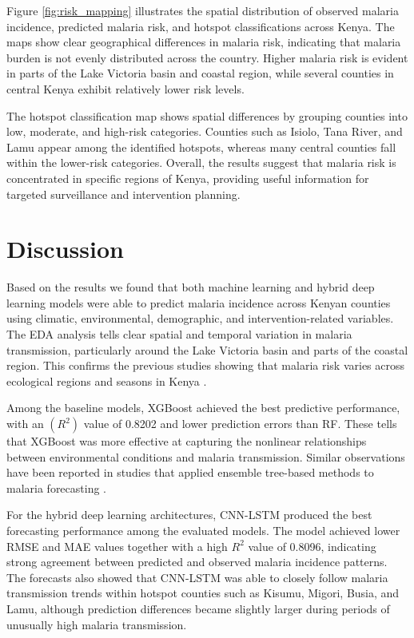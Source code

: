 \vspace{-0.3cm}

\small 
Figure \ref{fig:risk_mapping} illustrates the spatial distribution of observed malaria incidence, predicted malaria risk, and hotspot classifications across Kenya. The maps show clear geographical differences in malaria risk, indicating that malaria burden is not evenly distributed across the country. Higher malaria risk is evident in parts of the Lake Victoria basin and coastal region, while several counties in central Kenya exhibit relatively lower risk levels.

The hotspot classification map shows spatial differences by grouping counties into low, moderate, and high-risk categories. Counties such as  Isiolo, Tana River, and Lamu appear among the identified hotspots, whereas many central counties fall within the lower-risk categories. Overall, the results suggest that malaria risk is concentrated in specific regions of Kenya, providing useful information for targeted surveillance and intervention planning.

\section{Discussion}
Based on the results we found that both machine learning and hybrid deep learning models were able to predict malaria incidence across Kenyan counties using climatic, environmental, demographic, and intervention-related variables. The EDA analysis tells clear spatial and temporal variation in malaria transmission, particularly around the Lake Victoria basin and parts of the coastal region. This confirms the previous studies showing that malaria risk varies across ecological regions and seasons in Kenya \cite{amek2012spatial}.

Among the baseline models, XGBoost achieved the best predictive performance, with an $(R^2)$ value of 0.8202 and lower prediction errors than RF. These tells that XGBoost was more effective at capturing the nonlinear relationships between environmental conditions and malaria transmission. Similar observations have been reported in studies that applied ensemble tree-based methods to malaria forecasting \cite{Syafei2023}.

For the hybrid deep learning architectures, CNN-LSTM produced the best forecasting performance among the evaluated models. The model achieved lower RMSE and MAE values together with a high \(R^2\) value of 0.8096, indicating strong agreement between predicted and observed malaria incidence patterns. The forecasts also showed that CNN-LSTM was able to closely follow malaria transmission trends within hotspot counties such as Kisumu, Migori, Busia, and Lamu, although prediction differences became slightly larger during periods of unusually high malaria transmission.

